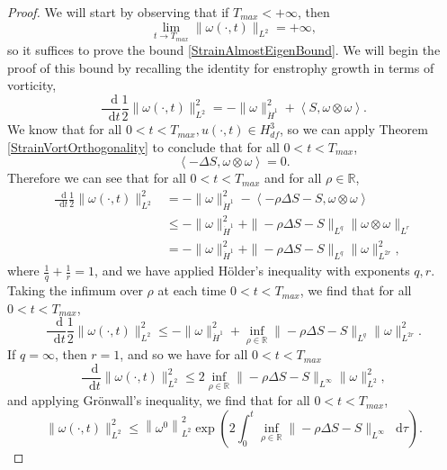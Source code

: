 \documentclass[11pt]{article}
\theoremstyle{plain}
\theoremstyle{remark}
\numberwithin{equation}{section}
\newcommand{\diff}{\mathop{}\!\mathrm{d}}
\begin{document}
\begin{proof}
We will start by observing that if $T_{max}<+\infty$, then
\begin{equation}
    \lim_{t\to T_{max}}\|\omega(\cdot,t)\|_{L^2}=+\infty,
\end{equation}
so it suffices to prove the bound 
\eqref{StrainAlmostEigenBound}.
We will begin the proof of this bound by recalling the identity for enstrophy growth in terms of vorticity,
\begin{equation}
    \frac{\diff}{\diff t}
    \frac{1}{2}\|\omega(\cdot,t)\|_{L^2}^2
    =-\|\omega\|_{\dot{H}^1}^2
    +\left<S,\omega\otimes\omega\right>.
\end{equation}
We know that for all $0<t<T_{max}, u(\cdot,t)\in H^3_{df}$,
so we can apply Theorem \ref{StrainVortOrthogonality}
to conclude that for all $0<t<T_{max}$,
\begin{equation}
    \left<-\Delta S,\omega\otimes\omega\right>=0.
\end{equation}
Therefore we can see that
for all $0<t<T_{max}$ and for all $\rho\in\mathbb{R}$,
\begin{align}
    \frac{\diff}{\diff t}
    \frac{1}{2}\|\omega(\cdot,t)\|_{L^2}^2
    &=
    -\|\omega\|_{\dot{H}^1}^2
    -\left<-\rho\Delta S-S,\omega\otimes\omega \right> \\
    &\leq
    -\|\omega\|_{\dot{H}^1}^2
    +\|-\rho\Delta S-S\|_{L^q}\|\omega\otimes\omega\|_{L^r} \\
    &=
    -\|\omega\|_{\dot{H}^1}^2
    +\|-\rho\Delta S-S\|_{L^q}\|\omega\|_{L^{2r}}^2,
\end{align}
where $\frac{1}{q}+\frac{1}{r}=1$, and we have applied H\"older's inequality with exponents $q,r$.
Taking the infimum over $\rho$ at each time $0<t<T_{max}$,
we find that for all $0<t<T_{max}$,
\begin{equation}
    \frac{\diff}{\diff t}
    \frac{1}{2}\|\omega(\cdot,t)\|_{L^2}^2
    \leq 
    -\|\omega\|_{\dot{H}^1}^2 +\inf_{\rho\in\mathbb{R}}
    \|-\rho\Delta S-S\|_{L^q}\|\omega\|_{L^{2r}}^2.
\end{equation}
If $q=\infty$, then $r=1$, and so we have
for all $0<t<T_{max}$
\begin{equation}
    \frac{\diff}{\diff t}
    \|\omega(\cdot,t)\|_{L^2}^2
    \leq 
    2\inf_{\rho\in\mathbb{R}}
    \|-\rho\Delta S-S\|_{L^\infty} \|\omega\|_{L^2}^2,
\end{equation}
and applying Gr\"onwall's inequality, we find that
for all $0<t<T_{max}$,
\begin{equation}
    \|\omega(\cdot,t)\|_{L^2}^2
    \leq \left\|\omega^0\right\|_{L^2}^2
    \exp\left(2\int_0^t
    \inf_{\rho\in\mathbb{R}}
    \|-\rho\Delta S-S\|_{L^\infty} 
    \diff\tau \right).
\end{equation}


\end{proof}
\end{document}
